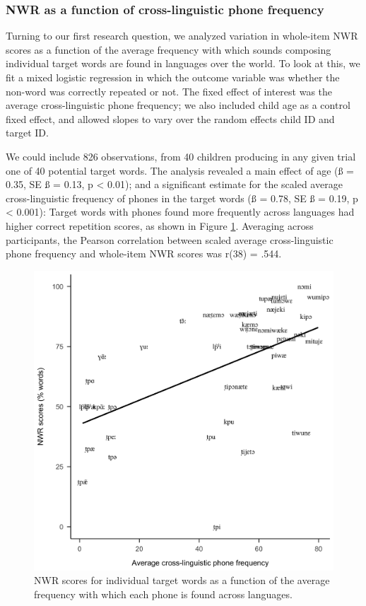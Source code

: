 \documentclass[english,,man,floatsintext]{apa6}
\begin{document}
\hypertarget{nwr-as-a-function-of-cross-linguistic-phone-frequency}{%
\subsubsection{NWR as a function of cross-linguistic phone frequency}\label{nwr-as-a-function-of-cross-linguistic-phone-frequency}}

Turning to our first research question, we analyzed variation in whole-item NWR scores as a function of the average frequency with which sounds composing individual target words are found in languages over the world. To look at this, we fit a mixed logistic regression in which the outcome variable was whether the non-word was correctly repeated or not. The fixed effect of interest was the average cross-linguistic phone frequency; we also included child age as a control fixed effect, and allowed slopes to vary over the random effects child ID and target ID.

We could include 826 observations, from 40 children producing in any given trial one of 40 potential target words. The analysis revealed a main effect of age (ß = 0.35, SE ß = 0.13, p \textless{} 0.01); and a significant estimate for the scaled average cross-linguistic frequency of phones in the target words (ß = 0.78, SE ß = 0.19, p \textless{} 0.001): Target words with phones found more frequently across languages had higher correct repetition scores, as shown in Figure \ref{fig:fig-xling-freq}. Averaging across participants, the Pearson correlation between scaled average cross-linguistic phone frequency and whole-item NWR scores was r(38) = .544.

\begin{figure}[!t]

{\centering \includegraphics[width=0.65\linewidth]{nwr.by.freq.ITEM} 

}

\caption{NWR scores for individual target words as a function of the average frequency with which each phone is found across languages.}\label{fig:fig-xling-freq}
\end{figure}
\end{document}
